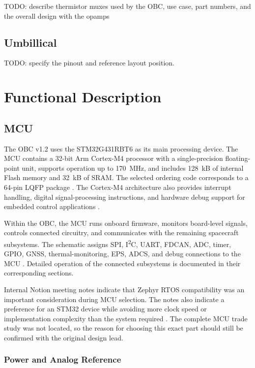 \documentclass[10pt]{../datasheet}
\begin{document}
TODO: describe thermistor muxes used by the OBC, use case, part numbers, and the
overall design with the opamps

\subsection{Umbillical}

TODO: specify the pinout and reference layout position.

\section{Functional Description}

\subsection{MCU}

The OBC v1.2 uses the STM32G431RBT6 as its main processing device. The MCU
contains a 32-bit Arm Cortex-M4 processor with a single-precision floating-point
unit, supports operation up to 170~MHz, and includes 128~kB of internal Flash
memory and 32~kB of SRAM. The selected ordering code corresponds to a 64-pin
LQFP package \cite{stm32g431-datasheet}. The Cortex-M4 architecture also
provides interrupt handling, digital signal-processing instructions, and
hardware debug support for embedded control applications
\cite{arm-cortex-m4}.

Within the OBC, the MCU runs onboard firmware, monitors board-level signals,
controls connected circuitry, and communicates with the remaining spacecraft
subsystems. The schematic assigns SPI, I\textsuperscript{2}C, UART, FDCAN, ADC,
timer, GPIO, GNSS, thermal-monitoring, EPS, ADCS, and debug connections to the
MCU \cite{obc-schematic}. Detailed operation of the connected subsystems is
documented in their corresponding sections.

Internal Notion meeting notes indicate that Zephyr RTOS compatibility was an
important consideration during MCU selection. The notes also indicate a
preference for an STM32 device while avoiding more clock speed or implementation
complexity than the system required \cite{notion-meeting-notes}. The complete
MCU trade study was not located, so the reason for choosing this exact part
should still be confirmed with the original design lead.

\subsubsection{Power and Analog Reference}
\end{document}
